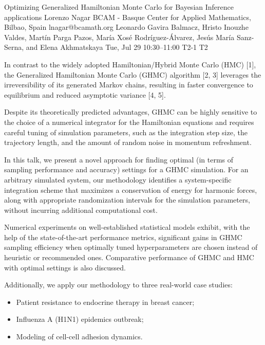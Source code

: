\begin{talk}
  {Optimizing Generalized Hamiltonian Monte Carlo for Bayesian Inference applications}%
  {Lorenzo Nagar}%
  {BCAM - Basque Center for Applied Mathematics, Bilbao, Spain}%
  {lnagar@bcamath.org}%
  {Leonardo Gavira Balmacz, Hristo Inouzhe Valdes, Mart\'in Parga Pazos, Mar\'ia Xos\'e Rodr\'iguez-\'Alvarez, Jes\'us Mar\'ia Sanz-Serna, and Elena Akhmatskaya}%
  {}%
  {Tue, Jul 29 10:30--11:00}%
  {T2-1}%
  {T2}%
  
    
   
In contrast to the widely adopted Hamiltonian/Hybrid Monte Carlo (HMC) [1], the Generalized Hamiltonian Monte Carlo (GHMC) algorithm [2, 3] leverages the irreversibility of its generated Markov chains, resulting in faster convergence to equilibrium and reduced asymptotic variance [4, 5]. 

Despite its theoretically predicted advantages, GHMC can be highly sensitive to the choice of a numerical integrator for the Hamiltonian equations and requires careful tuning of simulation parameters, such as the integration step size, the trajectory length, and the amount of random noise in momentum refreshment.

In this talk, we present a novel approach for finding optimal (in terms of sampling performance and accuracy) settings for a GHMC simulation. For an arbitrary simulated system, our methodology identifies a system-specific integration scheme that maximizes a conservation of energy for harmonic forces, along with appropriate randomization intervals for the simulation parameters, without incurring additional computational cost.

Numerical experiments on well-established statistical models exhibit, with the help of the state-of-the-art performance metrics, significant gains in GHMC sampling efficiency when optimally tuned hyperparameters are chosen instead of heuristic or recommended ones. Comparative performance of GHMC and HMC with optimal settings is also discussed. 

Additionally, we apply our methodology to three real-world case studies:
\begin{itemize}
\item Patient resistance to endocrine therapy in breast cancer;
\item Influenza A (H1N1) epidemics outbreak;
\item Modeling of cell-cell adhesion dynamics.
\end{itemize}


\end{talk}
